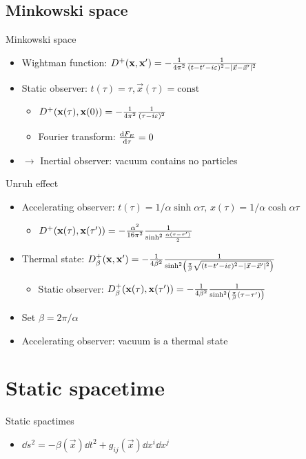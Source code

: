 \documentclass{beamer}
\renewcommand{\va}[1]{\vec{#1}}
\begin{document}
\subsection{Minkowski space}
\begin{frame}{Minkowski space}
\begin{itemize}
	\item Wightman function: \(D^+(\vb{x},\vb{x}') = -\frac{1}{4\pi^2} \frac{1}{(t-t'-i\varepsilon)^2 - |\va{x}-\va{x}'|^2}\)
	\item Static observer: \(t(\tau) = \tau, \va{x}(\tau) = \mathrm{const}\)
	\begin{itemize}
		\item \(D^+(\vb{x}(\tau),\vb{x}(0)) = -\frac{1}{4\pi^2} \frac{1}{(\tau-i\varepsilon)^2}\)
		\item Fourier transform: \(\dv{F_E}{\tau} = 0\)
	\end{itemize}
	\item[]\(\to\) Inertial observer: vacuum contains no particles
\end{itemize}
\end{frame}

\begin{frame}{Unruh effect}
\begin{itemize}
	\item Accelerating observer: \(t(\tau) = 1/\alpha \sinh \alpha\tau,\,x(\tau) = 1/\alpha \cosh \alpha\tau\)
	\begin{itemize}
		\item \(D^+(\vb{x}(\tau), \vb{x}(\tau')) = -\frac{\alpha^2}{16\pi^2} \frac{1}{\sinh^2\frac{\alpha(\tau-\tau')}{2}}\)
	\end{itemize}
	\item Thermal state: \(D^+_\beta(\vb{x},\vb{x}') = -\frac{1}{4\beta^2} \frac{1}{\sinh[2](\frac{\pi}{\beta}\sqrt{(t-t'-i\varepsilon)^2 - |\va{x}-\va{x}'|^2})}\)
	\begin{itemize}
		\item Static observer: \(D^+_\beta(\vb{x}(\tau),\vb{x}(\tau')) = -\frac{1}{4\beta^2} \frac{1}{\sinh[2](\frac{\pi}{\beta} (\tau-\tau'))}\)
	\end{itemize}
	\item Set \(\beta = 2\pi/\alpha\)
	\item Accelerating observer: vacuum is a thermal state
\end{itemize}
\end{frame}

\section{Static spacetime}
\begin{frame}{Static spactimes}
\begin{itemize}
	\item \(\dd{s^2} = -\beta(\va{x}) \dd{t^2} + g_{ij}(\va{x}) \dd{x^i} \dd{x^j}\)
\end{itemize}
\end{frame}
\end{document}
